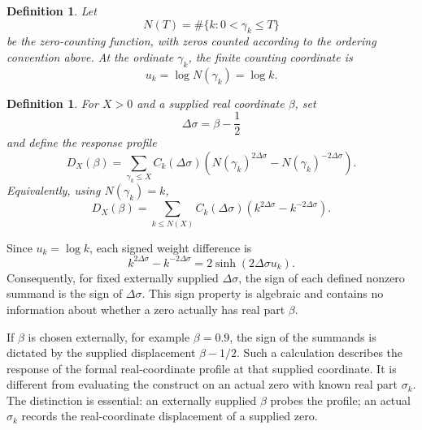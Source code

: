 \documentclass[12pt]{article}
\numberwithin{equation}{section}
\newtheorem{definition}[theorem]{Definition}
\begin{document}
\begin{definition}
\label{def:zero_counting_function}
Let
\begin{equation}
N(T)
=
\#\{k:0<\gamma_k\leq T\}
\label{eq:zero_counting_function}
\end{equation}
be the zero-counting function, with zeros counted according to the ordering convention above.  At the ordinate \(\gamma_k\), the finite counting coordinate is
\begin{equation}
u_k
=
\log N(\gamma_k)
=
\log k.
\label{eq:logarithmic_counting_coordinate_Dx}
\end{equation}
\end{definition}

\begin{definition}
\label{def:DX_beta_balance}
For \(X>0\) and a supplied real coordinate \(\beta\), set
\begin{equation}
\Delta\sigma
=
\beta-\frac{1}{2}
\label{eq:real_displacement_from_critical_line}
\end{equation}
and define the response profile
\begin{equation}
D_X(\beta)
=
\sum_{\gamma_k\leq X}
C_k(\Delta\sigma)
\left(
N(\gamma_k)^{2\Delta\sigma}
-
N(\gamma_k)^{-2\Delta\sigma}
\right).
\label{eq:DX_beta_balance}
\end{equation}
Equivalently, using \(N(\gamma_k)=k\),
\begin{equation}
D_X(\beta)
=
\sum_{k\leq N(X)}
C_k(\Delta\sigma)
\left(
k^{2\Delta\sigma}-k^{-2\Delta\sigma}
\right).
\label{eq:DX_beta_indexed_balance}
\end{equation}
\end{definition}


\noindent Since \(u_k=\log k\), each signed weight difference is
\begin{equation}
k^{2\Delta\sigma}-k^{-2\Delta\sigma}
=
2\sinh(2\Delta\sigma u_k).
\end{equation}
Consequently, for fixed externally supplied \(\Delta\sigma\), the sign of each defined nonzero summand is the sign of \(\Delta\sigma\).  This sign property is algebraic and contains no information about whether a zero actually has real part \(\beta\).


\noindent If \(\beta\) is chosen externally, for example \(\beta=0.9\), the sign of the summands is dictated by the supplied displacement \(\beta-1/2\).  Such a calculation describes the response of the formal real-coordinate profile at that supplied coordinate.  It is different from evaluating the construct on an actual zero with known real part \(\sigma_k\).  The distinction is essential: an externally supplied \(\beta\) probes the profile; an actual \(\sigma_k\) records the real-coordinate displacement of a supplied zero.
\end{document}
